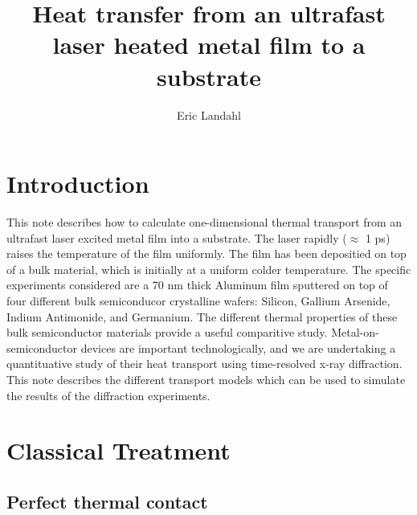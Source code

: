 \documentclass[letterpaper,11pt]{article}
\begin{document}
\title{Heat transfer from an ultrafast laser heated metal film to a substrate}
\author{Eric Landahl}

\maketitle

\section{Introduction}
This note describes how to calculate one-dimensional thermal transport from an ultrafast laser excited metal film into a substrate.  The laser rapidly  ($\approx$ 1 ps) raises the temperature of the film uniformly.  The film has been depositied on top of a bulk material, which is initially at a uniform colder temperature.   The specific experiments considered are a 70 nm thick Aluminum film sputtered on top of four different bulk semiconducor crystalline wafers:  Silicon, Gallium Arsenide, Indium Antimonide, and Germanium.  The different thermal properties of these bulk semiconductor materials provide a useful comparitive study.  Metal-on-semiconductor devices are important technologically, and we are undertaking a quantituative study of their heat transport using time-resolved x-ray diffraction.  This note describes the different transport models which can be used to simulate the results of the diffraction experiments. 

\section{Classical Treatment}

\subsection{Perfect thermal contact}
\end{document}
